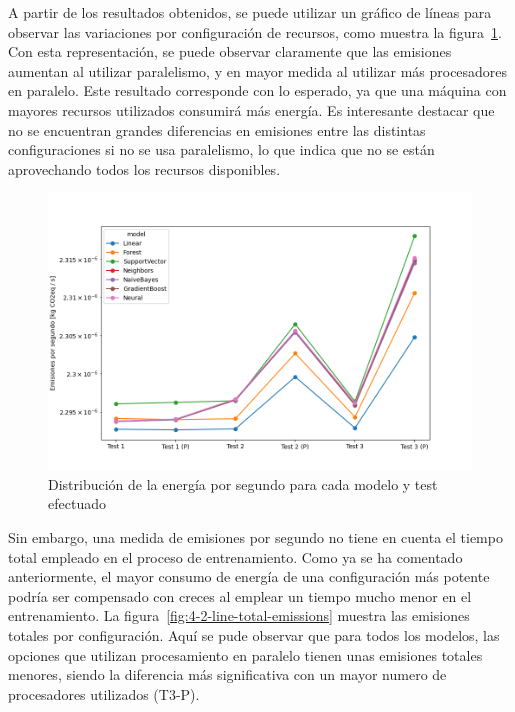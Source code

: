 A partir de los resultados obtenidos, se puede utilizar un gráfico de líneas para observar las variaciones por configuración de recursos, como muestra la figura~\ref{fig:4-2-line-energy-per-second}. Con esta representación, se puede observar claramente que las emisiones aumentan al utilizar paralelismo, y en mayor medida al utilizar más procesadores en paralelo. Este resultado corresponde con lo esperado, ya que una máquina con mayores recursos utilizados consumirá más energía. Es interesante destacar que no se encuentran grandes diferencias en emisiones entre las distintas configuraciones si no se usa paralelismo, lo que indica que no se están aprovechando todos los recursos disponibles.

\begin{figure}[H]
  \centerline{
     \includegraphics[width=\textwidth, keepaspectratio]{img/graph/4-2-line-emissions-persec.png}
  }
  \caption{Distribución de la energía por segundo para cada modelo y test efectuado}
  \label{fig:4-2-line-energy-per-second}
\end{figure}

Sin embargo, una medida de emisiones por segundo no tiene en cuenta el tiempo total empleado en el proceso de entrenamiento. Como ya se ha comentado anteriormente, el mayor consumo de energía de una configuración más potente podría ser compensado con creces al emplear un tiempo mucho menor en el entrenamiento. La figura~\ref{fig:4-2-line-total-emissions} muestra las emisiones totales por configuración. Aquí se pude observar que para todos los modelos, las opciones que utilizan procesamiento en paralelo tienen unas emisiones totales menores, siendo la diferencia más significativa con un mayor numero de procesadores utilizados (T3-P).

